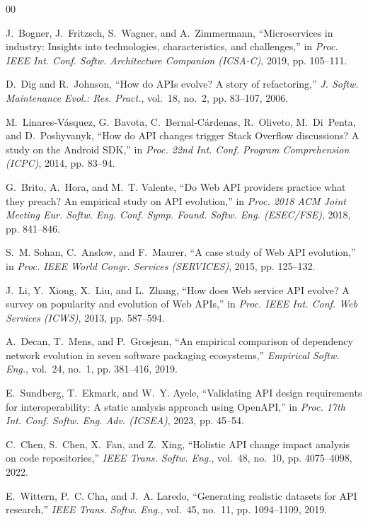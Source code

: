 \documentclass[conference]{IEEEtran}
\begin{document}
\begin{thebibliography}{00}

J.~Bogner, J.~Fritzsch, S.~Wagner, and A.~Zimmermann, ``Microservices in industry: Insights into technologies, characteristics, and challenges,'' in \emph{Proc. IEEE Int. Conf. Softw. Architecture Companion (ICSA-C)}, 2019, pp. 105--111.

D.~Dig and R.~Johnson, ``How do APIs evolve? A story of refactoring,'' \emph{J. Softw. Maintenance Evol.: Res. Pract.}, vol.~18, no.~2, pp. 83--107, 2006.

M.~Linares-V{\'a}squez, G.~Bavota, C.~Bernal-C{\'a}rdenas, R.~Oliveto, M.~Di~Penta, and D.~Poshyvanyk, ``How do API changes trigger Stack Overflow discussions? A study on the Android SDK,'' in \emph{Proc. 22nd Int. Conf. Program Comprehension (ICPC)}, 2014, pp. 83--94.

G.~Brito, A.~Hora, and M.~T. Valente, ``Do Web API providers practice what they preach? An empirical study on API evolution,'' in \emph{Proc. 2018 ACM Joint Meeting Eur. Softw. Eng. Conf. Symp. Found. Softw. Eng. (ESEC/FSE)}, 2018, pp. 841--846.

S.~M. Sohan, C.~Anslow, and F.~Maurer, ``A case study of Web API evolution,'' in \emph{Proc. IEEE World Congr. Services (SERVICES)}, 2015, pp. 125--132.

J.~Li, Y.~Xiong, X.~Liu, and L.~Zhang, ``How does Web service API evolve? A survey on popularity and evolution of Web APIs,'' in \emph{Proc. IEEE Int. Conf. Web Services (ICWS)}, 2013, pp. 587--594.

A.~Decan, T.~Mens, and P.~Grosjean, ``An empirical comparison of dependency network evolution in seven software packaging ecosystems,'' \emph{Empirical Softw. Eng.}, vol.~24, no.~1, pp. 381--416, 2019.

E.~Sundberg, T.~Ekmark, and W.~Y. Ayele, ``Validating API design requirements for interoperability: A static analysis approach using OpenAPI,'' in \emph{Proc. 17th Int. Conf. Softw. Eng. Adv. (ICSEA)}, 2023, pp. 45--54.

C.~Chen, S.~Chen, X.~Fan, and Z.~Xing, ``Holistic API change impact analysis on code repositories,'' \emph{IEEE Trans. Softw. Eng.}, vol.~48, no.~10, pp. 4075--4098, 2022.

E.~Wittern, P.~C. Cha, and J.~A. Laredo, ``Generating realistic datasets for API research,'' \emph{IEEE Trans. Softw. Eng.}, vol.~45, no.~11, pp. 1094--1109, 2019.


\end{thebibliography}
\end{document}
